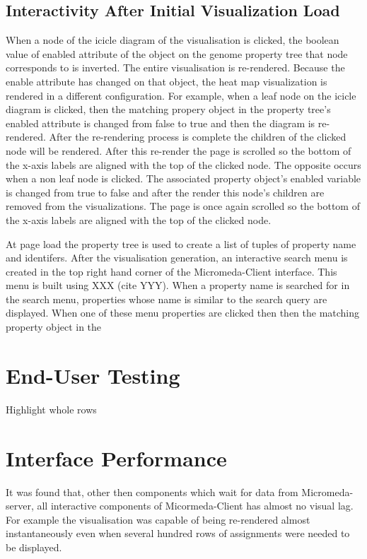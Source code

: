 \subsection{Interactivity After Initial Visualization Load}

When a node of the icicle diagram of the visualisation is clicked, the boolean value of enabled attribute of the object on the genome property tree that node corresponds to is inverted. The entire visualisation is re-rendered. Because the enable attribute has changed on that object, the heat map visualization is rendered in a different configuration. For example, when a leaf node on the icicle diagram is clicked, then the matching propery object in the property tree's enabled attribute is changed from false to true and then the diagram is re-rendered. After the re-rendering process is complete the children of the clicked node will be rendered. After this re-render the page is scrolled so the bottom of the x-axis labels are aligned with the top of the clicked node. The opposite occurs when a non leaf node is clicked. The associated property object's enabled variable is changed from true to false and after the render this node's children are removed from the visualizations. The page is once again scrolled so the bottom of the x-axis labels are aligned with the top of the clicked node. 

At page load the property tree is used to create a list of tuples of property name and identifers. After the visualisation generation, an interactive search menu is created in the top right hand corner of the Micromeda-Client interface. This menu is built using XXX (cite YYY). When a property name is searched for in the search menu, properties whose name is similar to the search query are displayed. When one of these menu properties are clicked then then the matching property object in the 

\section{End-User Testing}

Highlight whole rows

\section{Interface Performance}

It was found that, other then components which wait for data from Micromeda-server, all interactive components of Micormeda-Client has almost no visual lag. For example the visualisation was capable of being re-rendered almost instantaneously even when several hundred rows of assignments were needed to be displayed.

